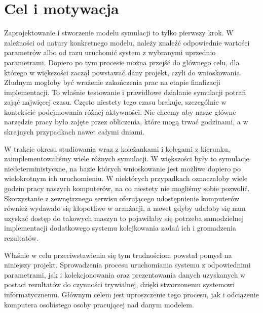 \chapter{Cel i motywacja}
\label{cha:celIMotywacja}

\par Zaprojektowanie i stworzenie modelu symulacji to tylko pierwszy krok. W zależności od natury konkretnego modelu, należy znaleźć odpowiednie wartości parametrów albo od razu uruchomić system z wybranymi uprzednio parametrami. Dopiero po tym procesie można przejść do głównego celu, dla którego w większości zaczął powstawać dany projekt, czyli do wnioskowania. Złudnym mogłoby być wrażenie zakończenia prac na etapie finalizacji implementacji. To właśnie testowanie i prawidłowe działanie symulacji potrafi zająć najwięcej czasu. Często niestety tego czasu brakuje, szczególnie w kontekście podejmowania różnej aktywności. Nie chcemy aby nasze główne narzędzie pracy było zajęte przez obliczenia, które mogą trwać godzinami, a w skrajnych przypadkach nawet całymi dniami.

\par W trakcie okresu studiowania wraz z koleżankami i kolegami z kierunku, zaimplementowaliśmy wiele różnych symulacji. W większości były to symulacje niedeterministyczne, na bazie których wnioskowanie jest możliwe dopiero po wielokrotnym ich uruchomieniu. W niektórych przypadkach oznaczałoby wiele godzin pracy naszych komputerów, na co niestety nie mogliśmy sobie pozwolić. Skorzystanie z zewnętrznego serwisu oferującego udostępnienie komputerów również wydawało się kłopotliwe w aranżacji, a nawet gdyby udałoby się nam uzyskać dostęp do takowych maszyn to pojawiłaby się potrzeba samodzielnej implementacji dodatkowego systemu kolejkowania zadań ich i gromadzenia rezultatów.

\par Właśnie w celu przeciwstawienia się tym trudnościom powstał pomysł na niniejszy projekt. Sprowadzenia procesu uruchomiania systemu z odpowiednimi parametrami, jak i kolekcjonowania oraz prezentowania danych uzyskanych w postaci rezultatów do czynności trywialnej, dzięki stworzonemu systemowi informatycznemu. Głównym celem jest uproszczenie tego procesu, jak i odciążenie komputera osobistego osoby pracującej nad danym modelem.
